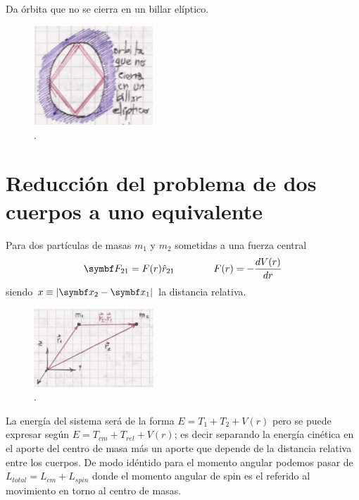 \documentclass[10pt,oneside]{CBFT_book}
\begin{document}
Da órbita que no se cierra en un billar elíptico.

\begin{figure}[hbt]
	\begin{center}
	\includegraphics[width=0.4\textwidth]{images/fig_mc_billar.pdf}
	\end{center}
	\caption{.}
\end{figure}

\section{Reducción del problema de dos cuerpos a uno equivalente}

Para dos partículas de masas $ m_1 $ y $ m_2 $ sometidas a una fuerza central 
\[
	\vb{F}_{21} = F(r) \hat{r}_{21} \qquad \qquad F(r) = -\dtot{V(r)}{r}
\]
siendo $x \equiv |\vb{x}_2-\vb{x}_1|$ la distancia relativa.

\begin{figure}[hbt]
	\begin{center}
	\includegraphics[width=0.4\textwidth]{images/fig_mc_prob_equiv_scheme.pdf}	 
	\end{center}
	\caption{.}
	\label{fig_mc_prob_equiv_scheme}
\end{figure} 

La energía del sistema será de la forma  $ E = T_1 + T_2 + V(r) $ pero se puede expresar según 
$ E = T_{cm} + T_{rel} + V(r) $; es decir separando la energía cinética en el aporte del centro de
masa más un aporte que depende de la distancia relativa entre los cuerpos.
De modo idéntido para el momento angular podemos pasar de $ L_{total} = L_{cm} + L_{spin} $ donde el
momento angular de spin es el referido al movimiento en torno al centro de masas.
\end{document}
